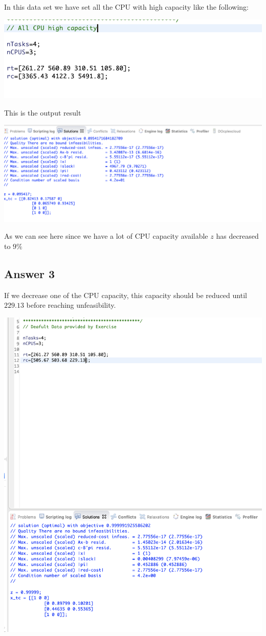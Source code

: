\documentclass[12pt, a4paper]{article}
\begin{document}
In this data set we have set all the CPU with high capacity like the following:

\includegraphics{data_3}

This is the output result

\includegraphics[width=\textwidth]{output_data_3}

As we can see here since we have a lot of CPU capacity available $z$ has
decreased to $9\%$

\subsection{Answer 3}

If we decrease one of the CPU capacity, this capacity should be reduced until
$229.13$ before reaching unfeasibility.

\includegraphics[width=\textwidth]{unfeasible}
\end{document}
